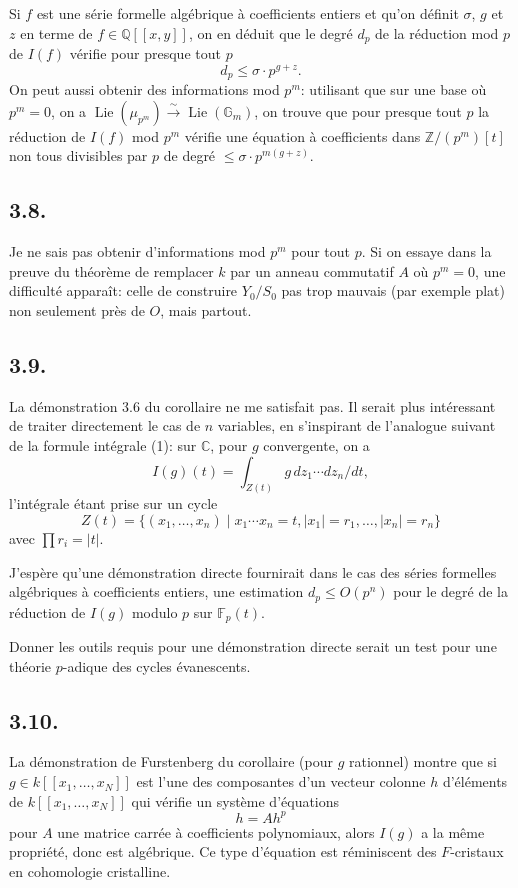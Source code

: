 \documentclass[11pt]{article}
\DeclareMathOperator{\Lie}{Lie}
\newcommand{\CC}{\mathbb C}
\newcommand{\GG}{\mathbb G}
\newcommand{\FF}{\mathbb F}
\newcommand{\ZZ}{\mathbb Z}
\newcommand{\QQ}{\mathbb Q}
\begin{document}
Si $f$ est une série formelle algébrique à coefficients entiers et qu'on définit $\sigma$, $g$ et $z$ en terme de $f\in\QQ[[x,y]]$, on en déduit que le degré $d_p$ de la réduction mod $p$ de $I(f)$ vérifie pour presque tout $p$
\begin{equation}
        d_p\le\sigma\cdot p^{g+z}. \tag{3.7.2}
\end{equation}
On peut aussi obtenir des informations mod $p^m$: utilisant que sur une base où $p^m=0$, on a $\Lie(\mu_{p^m})\xrightarrow{\sim}\Lie(\GG_m)$, on trouve que pour presque tout $p$ la réduction de $I(f)$ mod $p^m$ vérifie une équation à coefficients dans $\ZZ/(p^m)[t]$ non tous divisibles par $p$ de degré $\le\sigma\cdot p^{m(g+z)}$.

\subsection*{3.8.}
Je ne sais pas obtenir d'informations mod $p^m$ pour tout $p$. Si on essaye dans la preuve du théorème de remplacer $k$ par un anneau commutatif $A$ où $p^m=0$, une difficulté apparaît: celle de construire $Y_0/S_0$ pas trop mauvais (par exemple plat) non seulement près de $O$, mais partout.

\subsection*{3.9.}
La démonstration 3.6 du corollaire ne me satisfait pas. Il serait plus intéressant de traiter directement le cas de $n$ variables, en s'inspirant de l'analogue suivant de la formule intégrale (1): sur $\CC$, pour $g$ convergente, on a
\begin{equation}
        I(g)(t)=\int_{Z(t)} g\,dz_1\cdots dz_n/dt, \tag{$1'$}
\end{equation}
l'intégrale étant prise sur un cycle
\[
        Z(t)=\{(x_1,\ldots,x_n)\mid x_1\cdots x_n=t,
        |x_1|=r_1,\ldots,|x_n|=r_n\}
\]
avec $\prod r_i=|t|$.

J'espère qu'une démonstration directe fournirait dans le cas des séries formelles algébriques à coefficients entiers, une estimation $d_p\le O(p^n)$ pour le degré de la réduction de $I(g)$ modulo $p$ sur $\FF_p(t)$.

Donner les outils requis pour une démonstration directe serait un test pour une théorie $p$-adique des cycles évanescents.

\subsection*{3.10.}
La démonstration de Furstenberg du corollaire (pour $g$ rationnel) montre que si $g\in k[[x_1,\ldots,x_N]]$ est l'une des composantes d'un vecteur colonne $h$ d'éléments de $k[[x_1,\ldots,x_N]]$ qui vérifie un système d'équations
\[
        h=Ah^p
\]
pour $A$ une matrice carrée à coefficients polynomiaux, alors $I(g)$ a la même propriété, donc est algébrique. Ce type d'équation est réminiscent des $F$-cristaux en cohomologie cristalline.
\end{document}
